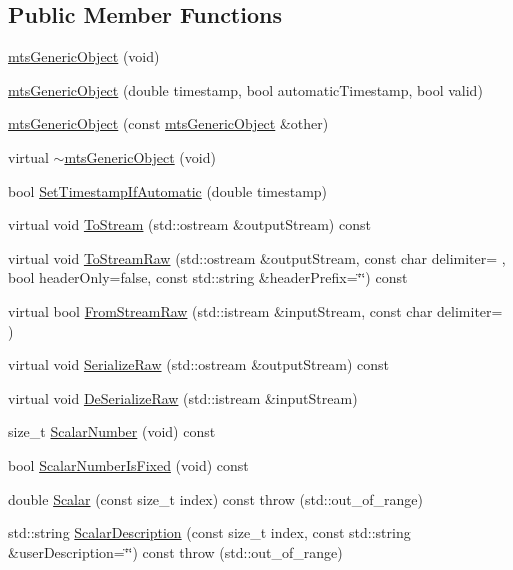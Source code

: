 \subsection*{Public Member Functions}
\begin{DoxyCompactItemize}
\item 
\hyperlink{classmts_generic_object_a8db6fa82ec6526194414c4c8bd9dee74}{mts\+Generic\+Object} (void)
\item 
\hyperlink{classmts_generic_object_a70bddbc580e56e7e127263febcad2ed8}{mts\+Generic\+Object} (double timestamp, bool automatic\+Timestamp, bool valid)
\item 
\hyperlink{classmts_generic_object_ade9d524eb6dc7ec1ec2507f91686442c}{mts\+Generic\+Object} (const \hyperlink{classmts_generic_object}{mts\+Generic\+Object} \&other)
\item 
virtual \hyperlink{classmts_generic_object_a1180fc7069c6f241f9be8449d45363d6}{$\sim$mts\+Generic\+Object} (void)
\item 
bool \hyperlink{classmts_generic_object_ad935c5369d451e6ce2ad17a08222bdcc}{Set\+Timestamp\+If\+Automatic} (double timestamp)
\item 
virtual void \hyperlink{classmts_generic_object_a2030aaa58bc215eccce1dc8d20dd0fdc}{To\+Stream} (std\+::ostream \&output\+Stream) const 
\item 
virtual void \hyperlink{classmts_generic_object_a4916a6c62ee5b167d7c93c88ab72523a}{To\+Stream\+Raw} (std\+::ostream \&output\+Stream, const char delimiter= \textquotesingle{} \textquotesingle{}, bool header\+Only=false, const std\+::string \&header\+Prefix=\char`\"{}\char`\"{}) const 
\item 
virtual bool \hyperlink{classmts_generic_object_a975ee040ad3b033df2c4bbdbabc34ed4}{From\+Stream\+Raw} (std\+::istream \&input\+Stream, const char delimiter= \textquotesingle{} \textquotesingle{})
\item 
virtual void \hyperlink{classmts_generic_object_a33d4404a50a87243ca5a1e2b1913dd3b}{Serialize\+Raw} (std\+::ostream \&output\+Stream) const 
\item 
virtual void \hyperlink{classmts_generic_object_af83ae8622a742a5b94bf72e53d20a1cd}{De\+Serialize\+Raw} (std\+::istream \&input\+Stream)
\item 
size\+\_\+t \hyperlink{classmts_generic_object_aa4d6ee134316f5deb7eab2850d1899dc}{Scalar\+Number} (void) const 
\item 
bool \hyperlink{classmts_generic_object_a1b3f1cc0518413adde75adf8241878c5}{Scalar\+Number\+Is\+Fixed} (void) const 
\item 
double \hyperlink{classmts_generic_object_a1c7505fe283dbce64c13463b139119f5}{Scalar} (const size\+\_\+t index) const   throw (std\+::out\+\_\+of\+\_\+range)
\item 
std\+::string \hyperlink{classmts_generic_object_a029201af36af658834041599d250b4f6}{Scalar\+Description} (const size\+\_\+t index, const std\+::string \&user\+Description=\char`\"{}\char`\"{}) const   throw (std\+::out\+\_\+of\+\_\+range)
\end{DoxyCompactItemize}


